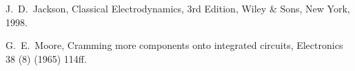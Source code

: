 \footnotesize
\begin{thebibliography}{0}

J.~D.~Jackson, Classical Electrodynamics, 3rd Edition, Wiley \& Sons, New York, 1998.

G.~E.~Moore, Cramming more components onto integrated circuits, Electronics 38 (8) (1965) 114ff.

\end{thebibliography}
\small